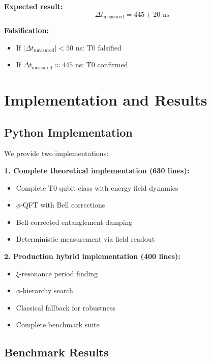\textbf{Expected result:}
\begin{equation}
	\Delta t_{\text{measured}} = 445 \pm 20 \text{ ns}
\end{equation}

\textbf{Falsification:}
\begin{itemize}
	\item If $|\Delta t_{\text{measured}}| < 50$ ns: T0 falsified
	\item If $\Delta t_{\text{measured}} \approx 445$ ns: T0 confirmed
\end{itemize}

\section{Implementation and Results}
\label{sec:implementation}

\subsection{Python Implementation}

We provide two implementations:

\textbf{1. Complete theoretical implementation (630 lines):}
\begin{itemize}
	\item Complete T0 qubit class with energy field dynamics
	\item $\phi$-QFT with Bell corrections
	\item Bell-corrected entanglement damping
	\item Deterministic measurement via field readout
\end{itemize}

\textbf{2. Production hybrid implementation (400 lines):}
\begin{itemize}
	\item $\xi$-resonance period finding
	\item $\phi$-hierarchy search
	\item Classical fallback for robustness
	\item Complete benchmark suite
\end{itemize}

\subsection{Benchmark Results}

